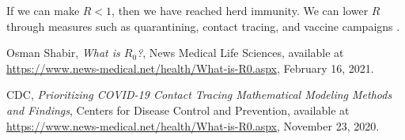 \documentclass{amsart}
\theoremstyle{definition}
\numberwithin{equation}{section}
\begin{document}
\begin{sansmath}
If we can make $R < 1$, then we have reached herd immunity. We can lower $R$ through measures such as quarantining, contact tracing, and vaccine campaigns \cite{CDC}.

\newpage


\begin{thebibliography}{12}
Osman Shabir, {\it What is $R_0$?},
News Medical Life Sciences,
available at \url{https://www.news-medical.net/health/What-is-R0.aspx},
February 16, 2021.

CDC, {\it Prioritizing COVID-19 Contact Tracing Mathematical Modeling Methods and Findings},
Centers for Disease Control and Prevention,
available at \url{https://www.news-medical.net/health/What-is-R0.aspx},
November 23, 2020.
\end{thebibliography}

\end{sansmath}
\end{document}
